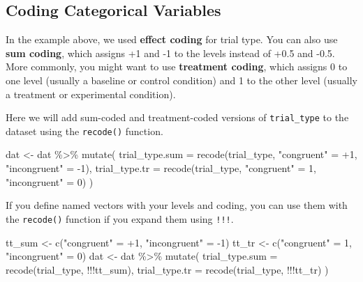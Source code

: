 \documentclass[
  oneside]{book}
\newenvironment{Shaded}{\begin{snugshade}}{\end{snugshade}}
\newcommand{\AttributeTok}[1]{\textcolor[rgb]{0.77,0.63,0.00}{#1}}
\newcommand{\DecValTok}[1]{\textcolor[rgb]{0.00,0.00,0.81}{#1}}
\newcommand{\FunctionTok}[1]{\textcolor[rgb]{0.00,0.00,0.00}{#1}}
\newcommand{\NormalTok}[1]{#1}
\newcommand{\OtherTok}[1]{\textcolor[rgb]{0.56,0.35,0.01}{#1}}
\newcommand{\SpecialCharTok}[1]{\textcolor[rgb]{0.00,0.00,0.00}{#1}}
\newcommand{\StringTok}[1]{\textcolor[rgb]{0.31,0.60,0.02}{#1}}
\begin{document}
\hypertarget{coding-schemes}{%
\subsection{Coding Categorical Variables}\label{coding-schemes}}

In the example above, we used \textbf{effect coding} for trial type. You can also use \textbf{sum coding}, which assigns +1 and -1 to the levels instead of +0.5 and -0.5. More commonly, you might want to use \textbf{treatment coding}, which assigns 0 to one level (usually a baseline or control condition) and 1 to the other level (usually a treatment or experimental condition).

Here we will add sum-coded and treatment-coded versions of \texttt{trial\_type} to the dataset using the \texttt{recode()} function.

\begin{Shaded}
\begin{Highlighting}[]
\NormalTok{dat }\OtherTok{\textless{}{-}}\NormalTok{ dat }\SpecialCharTok{\%\textgreater{}\%} \FunctionTok{mutate}\NormalTok{(}
  \AttributeTok{trial\_type.sum =} \FunctionTok{recode}\NormalTok{(trial\_type, }\StringTok{"congruent"} \OtherTok{=} \SpecialCharTok{+}\DecValTok{1}\NormalTok{, }\StringTok{"incongruent"} \OtherTok{=} \SpecialCharTok{{-}}\DecValTok{1}\NormalTok{),}
  \AttributeTok{trial\_type.tr =} \FunctionTok{recode}\NormalTok{(trial\_type, }\StringTok{"congruent"} \OtherTok{=} \DecValTok{1}\NormalTok{, }\StringTok{"incongruent"} \OtherTok{=} \DecValTok{0}\NormalTok{)}
\NormalTok{)}
\end{Highlighting}
\end{Shaded}

If you define named vectors with your levels and coding, you can use them with the \texttt{recode()} function if you expand them using \texttt{!!!}.

\begin{Shaded}
\begin{Highlighting}[]
\NormalTok{tt\_sum }\OtherTok{\textless{}{-}} \FunctionTok{c}\NormalTok{(}\StringTok{"congruent"}   \OtherTok{=} \SpecialCharTok{+}\DecValTok{1}\NormalTok{, }
            \StringTok{"incongruent"} \OtherTok{=} \SpecialCharTok{{-}}\DecValTok{1}\NormalTok{)}
\NormalTok{tt\_tr }\OtherTok{\textless{}{-}} \FunctionTok{c}\NormalTok{(}\StringTok{"congruent"}   \OtherTok{=} \DecValTok{1}\NormalTok{, }
           \StringTok{"incongruent"} \OtherTok{=} \DecValTok{0}\NormalTok{)}
\NormalTok{dat }\OtherTok{\textless{}{-}}\NormalTok{ dat }\SpecialCharTok{\%\textgreater{}\%} \FunctionTok{mutate}\NormalTok{(}
  \AttributeTok{trial\_type.sum =} \FunctionTok{recode}\NormalTok{(trial\_type, }\SpecialCharTok{!!!}\NormalTok{tt\_sum),}
  \AttributeTok{trial\_type.tr =} \FunctionTok{recode}\NormalTok{(trial\_type, }\SpecialCharTok{!!!}\NormalTok{tt\_tr)}
\NormalTok{)}
\end{Highlighting}
\end{Shaded}
\end{document}

